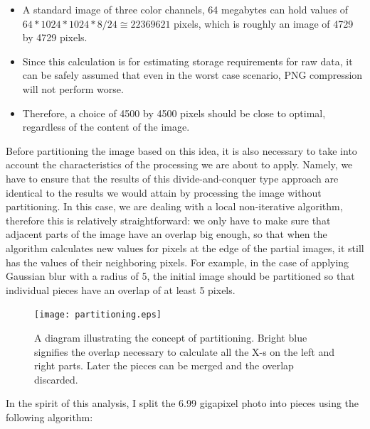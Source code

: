 \documentclass [12pt,a4paper]{report}
\begin{document}
\begin{itemize}
\item A standard image of three color channels, 64 megabytes can hold values of $64*1024*1024*8/24\cong22369621$ pixels, which is roughly an image of 4729 by 4729 pixels.
\item Since this calculation is for estimating storage requirements for raw data, it can be safely assumed that even in the worst case scenario, PNG compression will not perform worse.
\item Therefore, a choice of 4500 by 4500 pixels should be close to optimal, regardless of the content of the image.
\end{itemize}

Before partitioning the image based on this idea, it is also necessary to take into account the characteristics of the processing we are about to apply. Namely, we have to ensure that the results of this divide-and-conquer type approach are identical to the results we would attain by processing the image without partitioning. In this case, we are dealing with a local non-iterative algorithm, therefore this is relatively straightforward: we only have to make sure that adjacent parts of the image have an overlap big enough, so that when the algorithm calculates new values for pixels at the edge of the partial images, it still has the values of their neighboring pixels. For example, in the case of applying Gaussian blur with a radius of 5, the initial image should be partitioned so that individual pieces have an overlap of at least 5 pixels.

\begin{figure}[h]
\begin{center}
\texttt{[image: partitioning.eps]} %
\caption{A diagram illustrating the concept of partitioning. Bright blue signifies the overlap necessary to calculate all the X-s on the left and right parts. Later the pieces can be merged and the overlap discarded.}
\label{fig_partitioning}
\end{center}
\end{figure}

In the spirit of this analysis, I split the 6.99 gigapixel photo into pieces using the following algorithm:

\begin{center}
\begin{algorithm}[H]
\end{algorithm}
\end{center}
\end{document}
